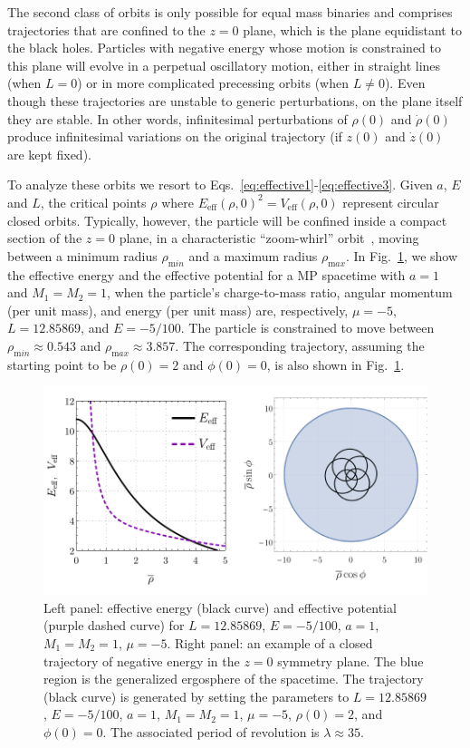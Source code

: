 The second class of orbits is only possible for equal mass binaries and comprises trajectories that are confined to the $z=0$ plane, which is the plane equidistant to the black holes. Particles with negative energy whose motion is constrained to this plane will evolve in a perpetual oscillatory motion, either in straight lines (when $L=0$) or in more complicated precessing orbits (when $L \neq 0$). Even though these trajectories are unstable to generic perturbations, on the plane itself they are stable. In other words, infinitesimal perturbations of $\rho(0)$ and $\dot \rho(0)$ produce infinitesimal variations on the original trajectory (if $z(0)$ and $\dot z(0)$ are kept fixed).


To analyze these orbits we resort to Eqs.~\eqref{eq:effective1}-\eqref{eq:effective3}.
Given $a$, $E$ and $L$, the critical points $\rho$ where $E_{\mathrm{eff}}(\rho,0)^2 = V_{\mathrm{eff}}(\rho,0)$ represent circular closed orbits. Typically, however, the particle will be confined inside a compact section of the $z=0$ plane, in a characteristic ``zoom-whirl'' orbit~\cite{ASSUMPCAO2018,Levin:2008mq}, moving between a minimum radius $\rho_{\mathrm min}$ and a maximum radius $\rho_{\mathrm max}$. In Fig.~\ref{fig:orbit_closed_z}, we show the effective energy and the effective potential for a MP spacetime with $a=1$ and $M_1 = M_2 = 1$, when the particle's charge-to-mass ratio, angular momentum (per unit mass), and energy (per unit mass) are, respectively, $\mu=-5$, $L=12.85869$, and $E=-5/100$. The particle is constrained to move between $\rho_{\mathrm min}\approx 0.543$ and $\rho_{\mathrm max}\approx 3.857$. The corresponding trajectory, assuming the starting point to be $\rho(0)=2$ and $\phi(0)=0$, is also shown in Fig.~\ref{fig:orbit_closed_z}.

\begin{figure}[!htbp]
    \centering
    \includegraphics[scale=0.70]{img/penrose_binaries/fig5.pdf}
    \caption{Left panel: effective energy (black curve) and effective potential (purple dashed curve) for $L=12.85869$, $E=-5/100$, $a=1$, $M_1 = M_2 = 1$, $\mu = -5$. Right panel: an example of a closed trajectory of negative energy in the $z = 0$ symmetry plane. The blue region is the generalized ergosphere of the spacetime. The trajectory (black curve) is generated by setting the parameters to $L=12.85869$, $E=-5/100$, $a=1$, $M_1 = M_2 = 1$, $\mu = -5$, $\rho(0) = 2$, and $\phi(0) = 0$. The associated period of revolution is $\lambda \approx 35$.}
    \label{fig:orbit_closed_z}
\end{figure}


